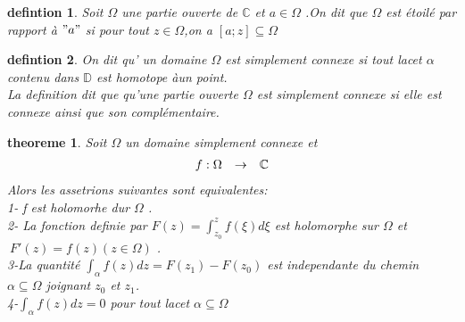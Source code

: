 \documentclass[a4paper,12pt]{book}
\newtheorem{definition}{defintion}[section]
\newtheorem{theoreme}{theoreme}[section]
\begin{document}
\begin{definition}
	Soit $ \Omega$ une partie ouverte de $\mathbb{C}$ et $ a\in \Omega$ .On dit que $\Omega$ est étoilé par rapport à $"a"$ si pour tout $z \in \Omega$,on a $ [a;z]\subseteq \Omega$ 
	
\end{definition}
\begin{definition}
	On dit qu' un domaine $ \Omega$ est simplement connexe si tout lacet $\alpha$ contenu dans $\mathbb{D}$ est homotope àun point.\\
	La definition dit que qu'une partie ouverte $\Omega$ est simplement connexe si elle est connexe ainsi que son complémentaire.
\end{definition}
\begin{theoreme}
	Soit $ \Omega$ un domaine simplement connexe et
	\[
	\begin{array}{r c l}
		f: \Omega & \to & \mathbb{C}\\
	\end{array}\]
Alors les assetrions suivantes sont equivalentes:\\
1- f est holomorhe dur $\Omega$ .\\
2- La fonction definie par $F(z)=\int_{z_0}^{z}f(\xi)d\xi$ est holomorphe sur $\Omega$ et $\ F'(z)=f(z) (z\in\Omega)$ .\\
3-La quantité $\int_{\alpha}f(z)dz=F(z_1)-F(z_0)$ est independante du chemin $\alpha\subseteq\Omega$ joignant $z_0$ et $ z_1$.\\
4-$\int_{\alpha}f(z)dz=0$ pour tout lacet $\alpha\subseteq\Omega$
\end{theoreme}
\end{document}
